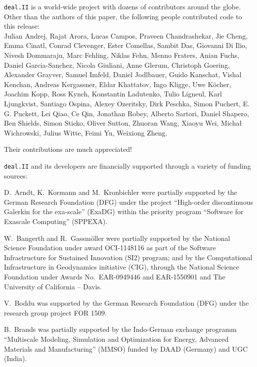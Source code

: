 \documentclass{ansarticle-preprint}
\newcommand{\specialword}[1]{\texttt{#1}}
\newcommand{\dealii}{{\specialword{deal.II}}\xspace}
\begin{document}
\dealii is a world-wide project with dozens of contributors around the
globe. Other than the authors of this paper, the following people contributed code to
this release:\\
%
%
Julian Andrej,
Rajat Arora,
Lucas Campos,
Praveen Chandrashekar,
Jie Cheng,
Emma Cinatl,
Conrad Clevenger,
Ester Comellas,
Sambit Das,
Giovanni Di Ilio,
Nivesh Dommaraju,
Marc Fehling,
Niklas Fehn,
Menno Fraters,
Anian Fuchs,
Daniel Garcia-Sanchez,
Nicola Giuliani,
Anne Glerum,
Christoph Goering,
Alexander Grayver,
Samuel Imfeld,
Daniel Jodlbauer,
Guido Kanschat,
Vishal Kenchan,
Andreas Kergassner,
Eldar Khattatov,
Ingo Kligge,
Uwe Köcher,
Joachim Kopp,
Ross Kynch,
Konstantin Ladutenko,
Tulio Ligneul,
Karl Ljungkvist,
Santiago Ospina,
Alexey Ozeritsky,
Dirk Peschka,
Simon Puchert,
E. G. Puckett,
Lei Qiao,
Ce Qin,
Jonathan Robey,
Alberto Sartori,
Daniel Shapero,
Ben Shields,
Simon Sticko,
Oliver Sutton,
Zhuoran Wang,
Xiaoyu Wei,
Michał Wichrowski,
Julius Witte,
Feimi Yu,
Weixiong Zheng.

Their contributions are much appreciated!


\bigskip

\dealii and its developers are financially supported through a
variety of funding sources:

D.~Arndt, K.~Kormann and M.~Kronbichler were partially supported by the German
Research Foundation (DFG) under the project ``High-order discontinuous
Galerkin for the exa-scale'' (\mbox{ExaDG}) within the priority program ``Software
for Exascale Computing'' (SPPEXA).

W.~Bangerth and R.~Gassm\"{o}ller were partially
supported by the National Science Foundation under award OCI-1148116
as part of the Software Infrastructure for Sustained Innovation (SI2)
program; and by the Computational Infrastructure in Geodynamics initiative
(CIG), through the National Science Foundation under Awards
No.~EAR-0949446 and EAR-1550901 and The University of California -- Davis.

V.~Boddu was supported by the German Research Foundation (DFG) under the
research group project FOR 1509.

B.~Brands was partially supported by the Indo-German exchange programm
``Multiscale Modeling, Simulation and Optimization for Energy, Advanced
Materials and Manufacturing'' (MMSO) funded by DAAD (Germany) and UGC
(India).
\end{document}
